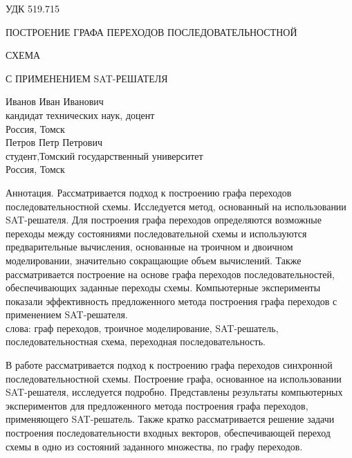 \documentclass[17pt]{extarticle}
\begin{document}
\pagestyle{empty}
\begin{flushleft}
УДК 519.715
\end{flushleft}

\noindent ПОСТРОЕНИЕ ГРАФА ПЕРЕХОДОВ ПОСЛЕДОВАТЕЛЬНОСТНОЙ \\ 

\vspace{-2.5em}
\begin{center}
СХЕМА
\end{center}

\vspace{-2.5em}
\begin{center}
С ПРИМЕНЕНИЕМ SAT-РЕШАТЕЛЯ
\end{center}

\vspace{-2em}
\begin{center}
Иванов Иван Иванович \\
кандидат технических наук, доцент\\
Россия, Томск \\
Петров Петр Петрович \\
студент,Томский государственный университет \\ 
Россия, Томск
\end{center}

Аннотация. Рассматривается подход к построению графа переходов последовательностной схемы. Исследуется метод, основанный на использовании SAT-решателя. Для построения графа переходов определяются возможные переходы между состояниями последовательной схемы и используются предварительные вычисления, основанные на троичном и двоичном моделировании, значительно сокращающие объем вычислений. Также рассматривается построение на основе графа переходов последовательностей, обеспечивающих заданные переходы схемы. Компьютерные эксперименты показали эффективность предложенного метода построения графа переходов с применением SAT-решателя. \\
 слова: граф переходов, троичное моделирование, SAT-решатель, последовательностная схема, переходная последовательность.

В работе рассматривается подход к построению графа переходов синхронной последовательностной схемы. Построение графа, основанное на использовании SAT-решателя, исследуется подробно. Представлены результаты компьютерных экспериментов для предложенного метода построения графа переходов, применяющего SAT-решатель. Также кратко рассматривается решение задачи построения последовательности входных векторов, обеспечивающей переход схемы в одно из состояний заданного множества, по графу переходов.
\end{document}
